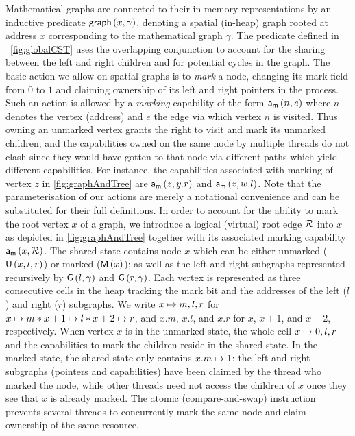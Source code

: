 Mathematical graphs are connected to their in-memory representations
by an inductive predicate $\textsf{graph}\left(x, \gamma\right)$, denoting a spatial
(in-heap) graph rooted at address $x$ corresponding to the
mathematical graph $\gamma$. The predicate defined in
\fig~\ref{fig:globalCST} uses the overlapping conjunction to account
for the sharing between the left and right children and for potential
cycles in the graph.  The basic
action we allow on spatial graphs is to \emph{mark} a node, changing
its mark field from $0$ to $1$ and claiming ownership of its left and
right pointers in the process. Such an action is allowed by a
\emph{marking} capability of the form $\mathsf{a}_{\textsf{m}}\left(n, e\right)$ where $n$ denotes
the vertex (address) and $e$ the edge via which vertex $n$ is visited.
Thus owning an unmarked vertex grants the right to visit and mark its
unmarked children, and the capabilities owned on the same node by
multiple threads do not clash since they would have gotten to that
node via different paths which yield different capabilities. For
instance, the capabilities associated with marking of vertex $z$ in
\fig\ref{fig:graphAndTree} are $\mathsf{a}_{\textsf{m}}\left(z, y.r\right)$ and
$\mathsf{a}_{\textsf{m}}\left(z, w.l\right)$. Note that the parameterisation of our actions are
merely a notational convenience and can be substituted for their full
definitions. In order to account for the ability to mark the root
vertex $x$ of a graph, we introduce a logical (virtual) root edge
$\mathcal{R}$ into $x$ as depicted in \fig\ref{fig:graphAndTree}
together with its associated marking capability
$\mathsf{a}_{\textsf{m}}\left(x, \mathcal{R}\right)$. The shared state contains node $x$ which can
be either unmarked ($\textsf{U}\left(x, l, r\right)$) or marked ($\textsf{M}\left(x\right)$); as
well as the left and right subgraphs represented recursively by
$\textsf{G}\left(l, \gamma\right)$ and $\textsf{G}\left(r, \gamma\right)$.
%
Each vertex is represented as three consecutive cells in the heap
tracking the mark bit and the addresses of the left ($l$) and right
($r$) subgraphs. We write $x \mapsto m, l, r$ for
$x \mapsto m * x+1 \mapsto l * x+2 \mapsto r$, and $x.m$, $x.l$, and
$x.r$ for $x$, $x+1$, and $x+2$, respectively. When vertex $x$ is in
the unmarked state, the whole cell $x \mapsto 0,l,r$ and the
capabilities to mark the children reside in the shared state. In the
marked state, the shared state only contains $x.m \mapsto 1$: the left
and right subgraphs (pointers and capabilities) have been claimed by
the thread who marked the node, while other threads need not access
the children of $x$ once they see that $x$ is already marked. The
atomic  (compare-and-swap) instruction prevents several threads to concurrently
mark the same node and claim ownership of the same resource.

